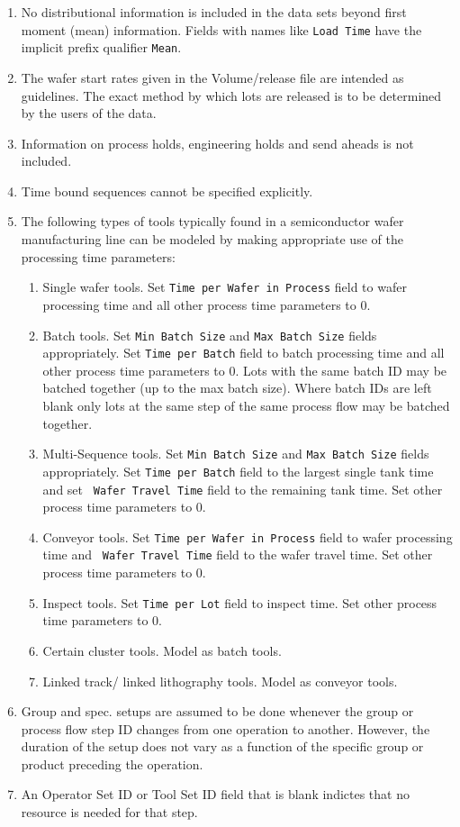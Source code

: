 \begin{enumerate}
   \item No distributional information is included in the data
   sets beyond first moment (mean) information.  Fields with
   names like \verb+Load Time+ have the implicit prefix qualifier
   \verb+Mean+.
   \item  The wafer start rates given in the Volume/release
   file are intended as guidelines.  The exact method by
   which lots are released is to be determined by the users of the
   data.
   \item  Information on
   process holds, engineering holds and send aheads is not included.
   \item Time bound sequences cannot be specified explicitly.
   \item The following types of tools typically found in a semiconductor
   wafer manufacturing line can be modeled by making appropriate
   use of the processing time parameters:
   \begin{enumerate}
   \item Single wafer tools.  Set \verb+Time per Wafer in Process+ field
   to wafer processing time and all other process time parameters to 0.
   \item Batch tools.  Set \verb+Min Batch Size+ and \verb+Max Batch Size+ 
   fields appropriately.  Set \verb+Time per Batch+
   field to batch processing time and all other process time
   parameters to 0. Lots with the same batch ID may be batched 
   together (up to the max batch size). Where batch IDs are left blank
   only lots at the same step of the same process flow may be batched together.
   \item Multi-Sequence tools.  Set \verb+Min Batch Size+ and 
   \verb+Max Batch Size+ fields appropriately.   Set \verb+Time per Batch+
   field to the largest single tank time and set 
   \verb+ Wafer Travel Time+ field to the  remaining tank time. Set other process
   time parameters to 0.
   \item Conveyor tools. Set \verb+Time per Wafer in Process+ field
   to wafer processing time and \verb+ Wafer Travel Time+ field 
   to the wafer travel time.  Set other process time parameters to 0.
   \item Inspect tools. Set \verb+Time per Lot+ field to inspect time.
   Set other process time parameters to 0.
   \item Certain cluster tools.  Model as batch tools.
   \item Linked track/ linked lithography tools. Model as conveyor
   tools.
   \end{enumerate}
   \item Group and spec. setups are assumed to be done whenever the group or 
   process flow step ID changes from one operation to another. However, the duration of the 
   setup does not vary as a function of the specific group or product preceding 
   the operation.
   \item An Operator Set ID or Tool Set ID field that is blank indictes that no resource is 
   needed for that step.
   \end{enumerate}
   \newpage
   
   
